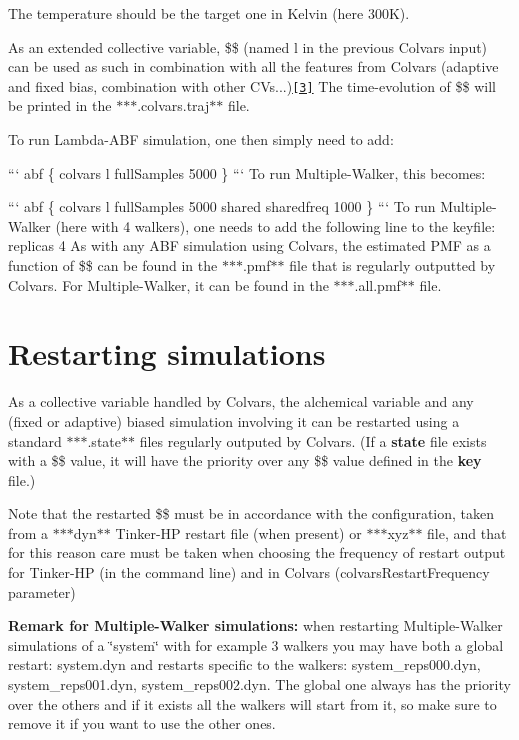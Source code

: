 The temperature should be the target one in Kelvin (here 300\-K).

As an extended collective variable, \$\$ (named l in the previous Colvars input) can be used as such in combination with all the features from Colvars (adaptive and fixed bias, combination with other C\-Vs...)\href{#3}{\tt \mbox{[}3\mbox{]}} The time-\/evolution of \$\$ will be printed in the $\ast$$\ast$$\ast$.colvars.\-traj$\ast$$\ast$ file.

To run Lambda-\/\-A\-B\-F simulation, one then simply need to add\-:

``` abf \{ colvars l full\-Samples 5000 \} ``` To run Multiple-\/\-Walker, this becomes\-:

``` abf \{ colvars l full\-Samples 5000 shared sharedfreq 1000 \} ``` To run Multiple-\/\-Walker (here with 4 walkers), one needs to add the following line to the keyfile\-: {\ttfamily replicas 4 } As with any A\-B\-F simulation using Colvars, the estimated P\-M\-F as a function of \$\$ can be found in the $\ast$$\ast$$\ast$.pmf$\ast$$\ast$ file that is regularly outputted by Colvars. For Multiple-\/\-Walker, it can be found in the $\ast$$\ast$$\ast$.all.\-pmf$\ast$$\ast$ file.

\section*{Restarting simulations}

As a collective variable handled by Colvars, the alchemical variable and any (fixed or adaptive) biased simulation involving it can be restarted using a standard $\ast$$\ast$$\ast$.state$\ast$$\ast$ files regularly outputed by Colvars. (If a {\bfseries state} file exists with a \$\$ value, it will have the priority over any \$\$ value defined in the {\bfseries key} file.)

Note that the restarted \$\$ must be in accordance with the configuration, taken from a $\ast$$\ast$$\ast$dyn$\ast$$\ast$ Tinker-\/\-H\-P restart file (when present) or $\ast$$\ast$$\ast$xyz$\ast$$\ast$ file, and that for this reason care must be taken when choosing the frequency of restart output for Tinker-\/\-H\-P (in the command line) and in Colvars ({\ttfamily colvars\-Restart\-Frequency} parameter)

{\bfseries Remark for Multiple-\/\-Walker simulations\-:} when restarting Multiple-\/\-Walker simulations of a \char`\"{}system\char`\"{} with for example 3 walkers you may have both a global restart\-: system.\-dyn and restarts specific to the walkers\-: system\-\_\-reps000.\-dyn, system\-\_\-reps001.\-dyn, system\-\_\-reps002.\-dyn. The global one always has the priority over the others and if it exists all the walkers will start from it, so make sure to remove it if you want to use the other ones.

